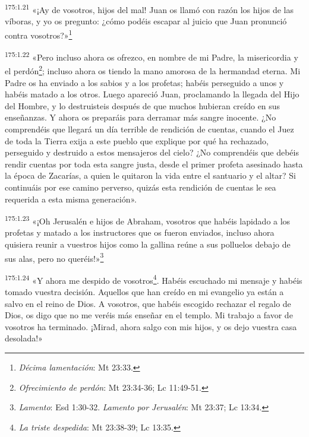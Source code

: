 \par
\textsuperscript{175:1.21} «¡Ay de vosotros, hijos del mal! Juan os llamó con razón los hijos de las víboras, y yo os pregunto: ¿cómo podéis escapar al juicio que Juan pronunció contra vosotros?»\footnote{\textit{Décima lamentación}: Mt 23:33.}

\par
\textsuperscript{175:1.22} «Pero incluso ahora os ofrezco, en nombre de mi Padre, la misericordia y el perdón\footnote{\textit{Ofrecimiento de perdón}: Mt 23:34-36; Lc 11:49-51.}; incluso ahora os tiendo la mano amorosa de la hermandad eterna. Mi Padre os ha enviado a los sabios y a los profetas; habéis perseguido a unos y habéis matado a los otros. Luego apareció Juan, proclamando la llegada del Hijo del Hombre, y lo destruisteis después de que muchos hubieran creído en sus enseñanzas. Y ahora os preparáis para derramar más sangre inocente. ¿No comprendéis que llegará un día terrible de rendición de cuentas, cuando el Juez de toda la Tierra exija a este pueblo que explique por qué ha rechazado, perseguido y destruido a estos mensajeros del cielo? ¿No comprendéis que debéis rendir cuentas por toda esta sangre justa, desde el primer profeta asesinado hasta la época de Zacarías, a quien le quitaron la vida entre el santuario y el altar? Si continuáis por ese camino perverso, quizás esta rendición de cuentas le sea requerida a esta misma generación».

\par
\textsuperscript{175:1.23} «¡Oh Jerusalén e hijos de Abraham, vosotros que habéis lapidado a los profetas y matado a los instructores que os fueron enviados, incluso ahora quisiera reunir a vuestros hijos como la gallina reúne a sus polluelos debajo de sus alas, pero no queréis!»\footnote{\textit{Lamento}: Esd 1:30-32. \textit{Lamento por Jerusalén}: Mt 23:37; Lc 13:34.}

\par
\textsuperscript{175:1.24} «Y ahora me despido de vosotros\footnote{\textit{La triste despedida}: Mt 23:38-39; Lc 13:35.}. Habéis escuchado mi mensaje y habéis tomado vuestra decisión. Aquellos que han creído en mi evangelio ya están a salvo en el reino de Dios. A vosotros, que habéis escogido rechazar el regalo de Dios, os digo que no me veréis más enseñar en el templo. Mi trabajo a favor de vosotros ha terminado. ¡Mirad, ahora salgo con mis hijos, y os dejo vuestra casa desolada!»

